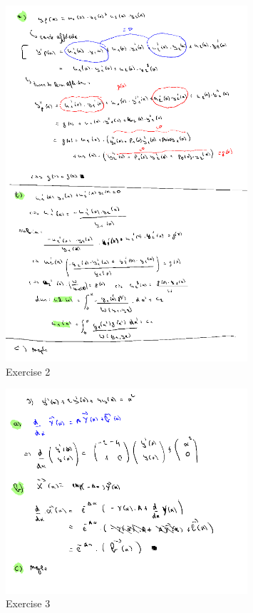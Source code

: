 \documentclass[a4paper]{report}
\begin{document}



\begin{figure}[H]
	\centering
	\includegraphics[width=0.8\textwidth]{assets/bord_8_ex_2.png}
	\caption{Exercise 2}
	\label{fig:bord_8_ex_2}
\end{figure}




\begin{figure}[H]
	\centering
	\includegraphics[width=0.8\textwidth]{assets/bord_8_ex_3.png}
	\caption{Exercise 3}
	\label{fig:bord_8_ex_3}
\end{figure}
\end{document}
